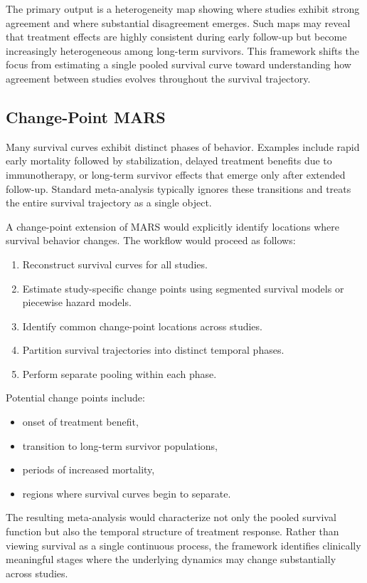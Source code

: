 \documentclass[11pt]{article}
\begin{document}
The primary output is a heterogeneity map showing where studies exhibit strong agreement and where substantial disagreement emerges. Such maps may reveal that treatment effects are highly consistent during early follow-up but become increasingly heterogeneous among long-term survivors. This framework shifts the focus from estimating a single pooled survival curve toward understanding how agreement between studies evolves throughout the survival trajectory.

\subsection{Change-Point MARS}

Many survival curves exhibit distinct phases of behavior. Examples include rapid early mortality followed by stabilization, delayed treatment benefits due to immunotherapy, or long-term survivor effects that emerge only after extended follow-up. Standard meta-analysis typically ignores these transitions and treats the entire survival trajectory as a single object.

A change-point extension of MARS would explicitly identify locations where survival behavior changes. The workflow would proceed as follows:

\begin{enumerate}
\item Reconstruct survival curves for all studies.
\item Estimate study-specific change points using segmented survival models or piecewise hazard models.
\item Identify common change-point locations across studies.
\item Partition survival trajectories into distinct temporal phases.
\item Perform separate pooling within each phase.
\end{enumerate}

Potential change points include:

\begin{itemize}
\item onset of treatment benefit,
\item transition to long-term survivor populations,
\item periods of increased mortality,
\item regions where survival curves begin to separate.
\end{itemize}

The resulting meta-analysis would characterize not only the pooled survival function but also the temporal structure of treatment response. Rather than viewing survival as a single continuous process, the framework identifies clinically meaningful stages where the underlying dynamics may change substantially across studies.
\end{document}
